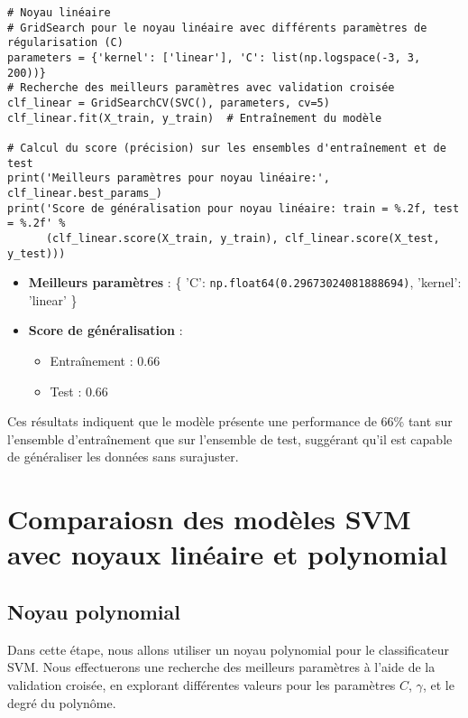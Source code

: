 \documentclass{article}
\begin{document}
\begin{verbatim}
# Noyau linéaire
# GridSearch pour le noyau linéaire avec différents paramètres de régularisation (C)
parameters = {'kernel': ['linear'], 'C': list(np.logspace(-3, 3, 200))}
# Recherche des meilleurs paramètres avec validation croisée
clf_linear = GridSearchCV(SVC(), parameters, cv=5)  
clf_linear.fit(X_train, y_train)  # Entraînement du modèle

# Calcul du score (précision) sur les ensembles d'entraînement et de test
print('Meilleurs paramètres pour noyau linéaire:', clf_linear.best_params_)
print('Score de généralisation pour noyau linéaire: train = %.2f, test = %.2f' %
      (clf_linear.score(X_train, y_train), clf_linear.score(X_test, y_test)))
\end{verbatim}

\begin{itemize}
    \item \textbf{Meilleurs paramètres} : \{ 'C': \texttt{np.float64(0.29673024081888694)}, 'kernel': 'linear' \}
    \item \textbf{Score de généralisation} :
    \begin{itemize}
        \item Entraînement : $0.66$
        \item Test : $0.66$
    \end{itemize}
\end{itemize}

Ces résultats indiquent que le modèle présente une performance de 66\% 
tant sur l'ensemble d'entraînement que sur l'ensemble de test, suggérant 
qu'il est capable de généraliser les données sans surajuster.

 \section{Comparaiosn des modèles SVM avec noyaux linéaire et polynomial}

\subsection{Noyau polynomial}

Dans cette étape, nous allons utiliser un noyau polynomial pour le 
classificateur SVM. Nous effectuerons une recherche des meilleurs 
paramètres à l'aide de la validation croisée, en explorant différentes 
valeurs pour les paramètres $C$, $\gamma$, et le degré du polynôme.
\end{document}
